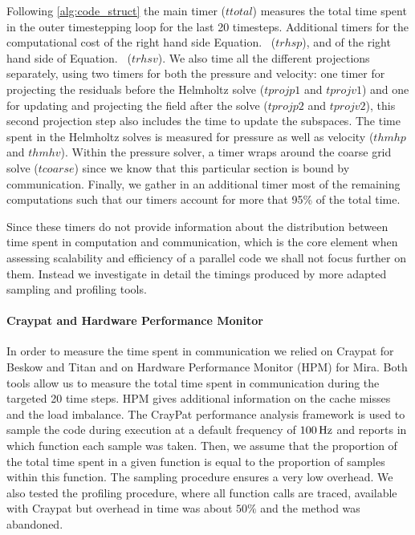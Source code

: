 \documentclass{sig-alternate}
\begin{document}
Following \ref{alg:code_struct} the main timer ($ttotal$) measures the total
time spent in the outer timestepping loop for the last 20 timesteps. Additional timers for the computational cost of the right hand side Equation.~ ($trhsp$), and of the right hand side of Equation.~ ($trhsv$). We also time all the different projections separately, using two timers for both the pressure and velocity: one timer for projecting the residuals before the Helmholtz solve ($tprojp1$ and $tprojv1$) and one for updating and projecting the field after the solve ($tprojp2$ and $tprojv2$), this second projection step also includes the time to update the subspaces. The time spent in the Helmholtz solves is measured for pressure as well as velocity ($thmhp$ and $thmhv$). Within the pressure solver, a timer wraps around the coarse grid solve ($tcoarse$) since we know that this particular section is bound by communication. Finally, we gather in an additional timer most of the remaining computations such that our timers account for more that 95\% of the total time. 

Since these timers do not provide information about the distribution between time spent in computation and communication, which is the core element when assessing scalability and efficiency of a parallel code we shall not focus further on them. Instead we investigate in detail  the timings produced by more adapted sampling and profiling tools.
\paragraph{Craypat and Hardware Performance Monitor}
In order to measure the time spent in communication we relied on Craypat for
Beskow and Titan and on Hardware Performance Monitor (HPM) for Mira. Both tools
allow us to measure the total time spent in communication during the targeted 20 time
steps. HPM gives additional information on the cache misses and the load
imbalance. The CrayPat performance analysis framework is used to sample the code during execution at a default frequency of $\unit[100]{Hz}$ and reports in which function each sample was taken. Then, we assume that the proportion of the total time spent in a given function is equal to the proportion of samples within this function. The sampling procedure ensures a very low overhead. We also tested the profiling procedure, where all function calls are traced, available with Craypat but overhead in time was about $50\%$ and the method was abandoned.
\end{document}
